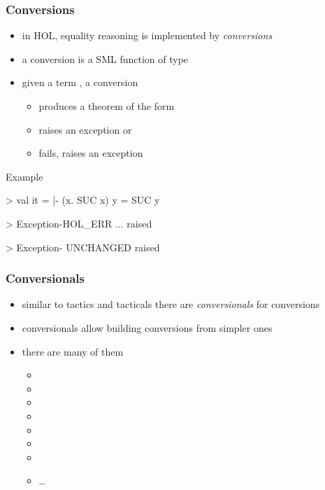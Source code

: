 \begin{frame}[fragile]
\frametitle{Conversions}
\begin{itemize}
\item in HOL, equality reasoning is implemented by \emph{conversions}
\item a conversion is a SML function of type 
\item given a term , a conversion
\begin{itemize}
\item produces a theorem of the form 
\item raises an  exception or
\item fails, \ie raises an  exception
\end{itemize}
\end{itemize}
\begin{exampleblock}{Example}
\begin{semiverbatim}\scriptsize
> 
val it = |- (\textbsl{}x. SUC x) y = SUC y

> 
Exception-HOL_ERR ... raised

> 
Exception- UNCHANGED raised
\end{semiverbatim}
\end{exampleblock}
\end{frame}

\begin{frame}[fragile]
\frametitle{Conversionals}
\begin{itemize}
\item similar to tactics and tacticals there are \emph{conversionals} for conversions
\item conversionals allow building conversions from simpler ones
\item there are many of them
\begin{itemize}
\item {}
\item {}
\item {}
\item {}
\item {}
\item {}
\item {}
\item \ldots
\end{itemize}
\end{itemize}
\end{frame}


